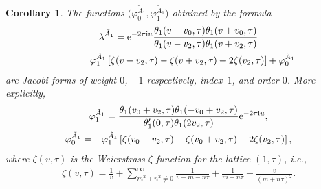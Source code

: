 \documentclass[pdftex]{sigma}%
\numberwithin{equation}{section}
\newtheorem{Corollary}[Theorem]{Corollary}
\begin{document}
\begin{Corollary}
The functions $\big(\varphi_0^{\tilde A_1},\varphi_1^{\tilde A_1}\big)$ obtained by the formula
\begin{gather}
\lambda^{\tilde A_1}={\rm e}^{-2\pi {\rm i} u}\frac{\theta_1(v-v_0,\tau)\theta_1(v+v_0,\tau)}
{\theta_1(v-v_2,\tau)\theta_1(v+v_2,\tau)}\nonumber
\\ \hphantom{\lambda^{\tilde A_1}}
{}=\varphi_{1}^{\tilde A_1}\left[\zeta(v-v_2,\tau)-\zeta(v+v_{2},\tau)+2\zeta(v_2,\tau)\right]+\varphi_0^{\tilde A_1}
\label{superpotentialA1}
\end{gather}
 are Jacobi forms of weight $0$, $-1$ respectively, index~$1$, and order $0$. More explicitly,
\begin{gather}
\varphi_{1}^{\tilde A_1}=\frac{\theta_1(v_0+v_2,\tau)\theta_1(-v_0+v_2,\tau)}{\theta^{\prime}_1(0,\tau)\theta_1(2v_2,\tau)}{\rm e}^{-2\pi {\rm i} u},\nonumber
\\
\varphi_{0}^{\tilde A_1}=-\varphi_{1}^{\tilde A_1}\left[\zeta(v_0-v_2,\tau)-\zeta(v_0+v_{2},\tau)+2\zeta(v_2,\tau)\right],
\label{thetaformulainvariant}
\end{gather}
where $\zeta(v,\tau)$ is the Weierstrass $\zeta$-function for the lattice $(1,\tau)$, i.e.,
\begin{gather*}
\zeta(v,\tau)=\frac{1}{v}+\sum_{m^2+n^2\neq 0}^{\infty} \frac{1}{v-m-n\tau}+\frac{1}{m+n\tau}+\frac{v}{(m+n\tau)^2}.
\end{gather*}
\end{Corollary}
\end{document}

